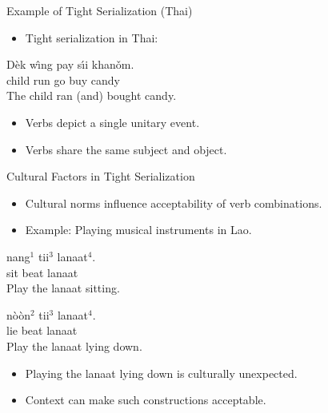 \documentclass{beamer}
\begin{document}
\begin{frame}{Example of Tight Serialization (Thai)}
\begin{itemize}
    \item Tight serialization in Thai:
\end{itemize}
\begin{exe}
\ex
\gll Dèk wı̂ng pay sı́i khanǒm. \\
    child run go buy candy \\
\trans The child ran (and) bought candy. \\
\end{exe}
\begin{itemize}
    \item Verbs depict a single unitary event.
    \item Verbs share the same subject and object.
\end{itemize}
\end{frame}

\begin{frame}{Cultural Factors in Tight Serialization}
\begin{itemize}
    \item Cultural norms influence acceptability of verb combinations.
    \item Example: Playing musical instruments in Lao.
\end{itemize}
\begin{exe}
\ex
\gll nang$^1$ tii$^3$ lanaat$^4$. \\
    sit beat lanaat \\
\trans Play the lanaat sitting. \\
\end{exe}
\begin{exe}
\ex
\gll nòòn$^2$ tii$^3$ lanaat$^4$. \\
    lie beat lanaat \\
\trans Play the lanaat lying down. \\
\end{exe}
\begin{itemize}
    \item Playing the lanaat lying down is culturally unexpected.
    \item Context can make such constructions acceptable.
\end{itemize}
\end{frame}
\end{document}
